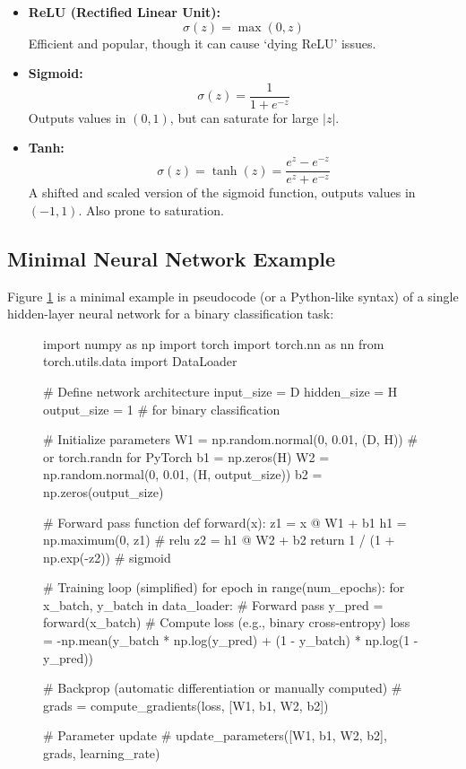 \begin{itemize}
    \item \textbf{ReLU (Rectified Linear Unit):} 
    \begin{equation}\label{eq:relu}
        \sigma(z) = \max(0, z)
    \end{equation}
    Efficient and popular, though it can cause `dying ReLU' issues.
    
    \item \textbf{Sigmoid:} 
    \begin{equation}\label{eq:sigmoid}
        \sigma(z) = \frac{1}{1+e^{-z}}
    \end{equation}
    Outputs values in $(0,1)$, but can saturate for large $|z|$.
    
    \item \textbf{Tanh:} 
    \begin{equation}\label{eq:tanh}
        \sigma(z) = \tanh(z) = \frac{e^z - e^{-z}}{e^z + e^{-z}}
    \end{equation}
    A shifted and scaled version of the sigmoid function, outputs values in $(-1, 1)$. Also prone to saturation.
\end{itemize}

\subsection{Minimal Neural Network Example}
\noindent
Figure \ref{fig:minimal_neural_network_example} is a minimal example in pseudocode (or a Python-like syntax) of a single hidden-layer neural network for a binary classification task:

\begin{figure}[h]
\begin{pythoncode}
import numpy as np
import torch
import torch.nn as nn
from torch.utils.data import DataLoader

# Define network architecture
input_size = D
hidden_size = H
output_size = 1  # for binary classification

# Initialize parameters
W1 = np.random.normal(0, 0.01, (D, H))  # or torch.randn for PyTorch
b1 = np.zeros(H)
W2 = np.random.normal(0, 0.01, (H, output_size))
b2 = np.zeros(output_size)

# Forward pass function
def forward(x):
    z1 = x @ W1 + b1
    h1 = np.maximum(0, z1)  # relu
    z2 = h1 @ W2 + b2
    return 1 / (1 + np.exp(-z2))  # sigmoid

# Training loop (simplified)
for epoch in range(num_epochs):
    for x_batch, y_batch in data_loader:
        # Forward pass
        y_pred = forward(x_batch)
        # Compute loss (e.g., binary cross-entropy)
        loss = -np.mean(y_batch * np.log(y_pred) + (1 - y_batch) * np.log(1 - y_pred))
        
        # Backprop (automatic differentiation or manually computed)
        # grads = compute_gradients(loss, [W1, b1, W2, b2])
        
        # Parameter update
        # update_parameters([W1, b1, W2, b2], grads, learning_rate)
\end{pythoncode}
\label{fig:minimal_neural_network_example}
\end{figure}

